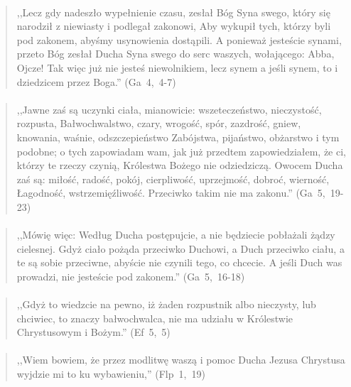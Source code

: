 \documentclass[10pt,a4paper,oneside]{article}
\begin{document}
\paragraph{}
\begin{quote}
,,Lecz gdy nadeszło wypełnienie czasu, zesłał Bóg Syna swego, który się narodził z niewiasty i podlegał zakonowi, Aby wykupił tych, którzy byli pod zakonem, abyśmy usynowienia dostąpili. A ponieważ jesteście synami, przeto Bóg zesłał Ducha Syna swego do serc waszych, wołającego: Abba, Ojcze! Tak więc już nie jesteś niewolnikiem, lecz synem a jeśli synem, to i dziedzicem przez Boga.'' \mbox{(Ga 4, 4-7)}
\end{quote}
\paragraph{}
\begin{quote}
,,Jawne zaś są uczynki ciała, mianowicie: wszeteczeństwo, nieczystość, rozpusta, Bałwochwalstwo, czary, wrogość, spór, zazdrość, gniew, knowania, waśnie, odszczepieństwo Zabójstwa, pijaństwo, obżarstwo i tym podobne; o tych zapowiadam wam, jak już przedtem zapowiedziałem, że ci, którzy te rzeczy czynią, Królestwa Bożego nie odziedziczą. Owocem Ducha zaś są: miłość, radość, pokój, cierpliwość, uprzejmość, dobroć, wierność, Łagodność, wstrzemięźliwość. Przeciwko takim nie ma zakonu.'' \mbox{(Ga 5, 19-23)}
\end{quote}
\paragraph{}
\begin{quote}
,,Mówię więc: Według Ducha postępujcie, a nie będziecie pobłażali żądzy cielesnej. Gdyż ciało pożąda przeciwko Duchowi, a Duch przeciwko ciału, a te są sobie przeciwne, abyście nie czynili tego, co chcecie. A jeśli Duch was prowadzi, nie jesteście pod zakonem.'' \mbox{(Ga 5, 16-18)}
\end{quote}
\paragraph{}
\begin{quote}
,,Gdyż to wiedzcie na pewno, iż żaden rozpustnik albo nieczysty, lub chciwiec, to znaczy bałwochwalca, nie ma udziału w Królestwie Chrystusowym i Bożym.'' \mbox{(Ef 5, 5)}
\end{quote}
\paragraph{}
\begin{quote}
,,Wiem bowiem, że przez modlitwę waszą i pomoc Ducha Jezusa Chrystusa wyjdzie mi to ku wybawieniu,'' \mbox{(Flp 1, 19)}
\end{quote}
\end{document}
